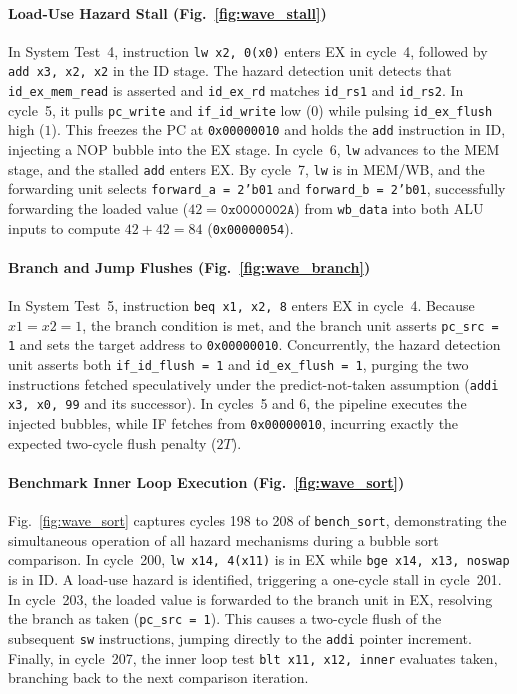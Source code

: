 \paragraph{Load-Use Hazard Stall (Fig.~\ref{fig:wave_stall})}
In System Test~4, instruction \texttt{lw x2, 0(x0)} enters EX in cycle~4, followed by
\texttt{add x3, x2, x2} in the ID stage. The hazard detection unit detects that
\texttt{id\_ex\_mem\_read} is asserted and \texttt{id\_ex\_rd} matches \texttt{id\_rs1}
and \texttt{id\_rs2}. In cycle~5, it pulls \texttt{pc\_write} and \texttt{if\_id\_write}
low ($0$) while pulsing \texttt{id\_ex\_flush} high ($1$). This freezes the PC at
\texttt{0x00000010} and holds the \texttt{add} instruction in ID, injecting a NOP bubble into
the EX stage. In cycle~6, \texttt{lw} advances to the MEM stage, and the stalled
\texttt{add} enters EX. By cycle~7, \texttt{lw} is in MEM/WB, and the forwarding unit
selects \texttt{forward\_a = 2'b01} and \texttt{forward\_b = 2'b01}, successfully
forwarding the loaded value ($42 = \texttt{0x0000002A}$) from \texttt{wb\_data} into both
ALU inputs to compute $42 + 42 = 84$ (\texttt{0x00000054}).

\paragraph{Branch and Jump Flushes (Fig.~\ref{fig:wave_branch})}
In System Test~5, instruction \texttt{beq x1, x2, 8} enters EX in cycle~4. Because
$x1 = x2 = 1$, the branch condition is met, and the branch unit asserts \texttt{pc\_src = 1}
and sets the target address to \texttt{0x00000010}. Concurrently, the hazard detection
unit asserts both \texttt{if\_id\_flush = 1} and \texttt{id\_ex\_flush = 1}, purging the
two instructions fetched speculatively under the predict-not-taken assumption
(\texttt{addi x3, x0, 99} and its successor). In cycles~5 and 6, the pipeline executes
the injected bubbles, while IF fetches from \texttt{0x00000010}, incurring exactly the
expected two-cycle flush penalty ($2T$).

\paragraph{Benchmark Inner Loop Execution (Fig.~\ref{fig:wave_sort})}
Fig.~\ref{fig:wave_sort} captures cycles 198 to 208 of \texttt{bench\_sort}, demonstrating
the simultaneous operation of all hazard mechanisms during a bubble sort comparison.
In cycle~200, \texttt{lw x14, 4(x11)} is in EX while \texttt{bge x14, x13, noswap} is in ID.
A load-use hazard is identified, triggering a one-cycle stall in cycle~201. In cycle~203,
the loaded value is forwarded to the branch unit in EX, resolving the branch as taken
(\texttt{pc\_src = 1}). This causes a two-cycle flush of the subsequent \texttt{sw}
instructions, jumping directly to the \texttt{addi} pointer increment. Finally, in cycle~207,
the inner loop test \texttt{blt x11, x12, inner} evaluates taken, branching back to
the next comparison iteration.
